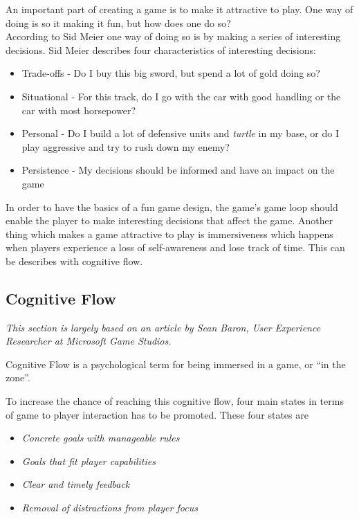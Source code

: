 An important part of creating a game is to make it attractive to play. One way of doing is so it making it fun, but how does one do so?\\
According to Sid Meier\cite{GDC2012} one way of doing so is by making a series of interesting decisions.
Sid Meier describes four characteristics of interesting decisions:\cite{GDC2012}
\begin{itemize}
	\item Trade-offs - Do I buy this big sword, but spend a lot of gold doing so?
	\item Situational - For this track, do I go with the car with good handling or the car with most horsepower?
	\item Personal - Do I build a lot of defensive units and \textit{turtle} in my base, or do I play aggressive and try to rush down my enemy?
	\item Persistence - My decisions should be informed and have an impact on the game
\end{itemize}

In order to have the basics of a fun game design, the game's game loop should enable the player to make interesting decisions that affect the game.
Another thing which makes a game attractive to play is immersiveness which happens when players experience a loss of self-awareness and lose track of time. This can be describes with cognitive flow.

\subsection{Cognitive Flow}\label{makingthegamefun:cognitiveflow}
\emph{This section is largely based on an article by Sean Baron, User Experience Researcher at Microsoft Game
Studios\cite{baron}.}

Cognitive Flow is a psychological term for being immersed in a game, or ``in the zone''.

To increase the chance of reaching this cognitive flow, four main states in terms of game to player interaction has to
be promoted.  
These four states are 
\begin{itemize}
    \item \emph{Concrete goals with manageable rules}
    \item \emph{Goals that fit player capabilities}
    \item \emph{Clear and timely feedback}
    \item \emph{Removal of distractions from player focus}
\end{itemize}

